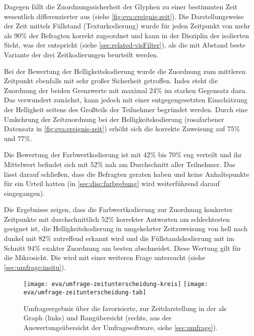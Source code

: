Dagegen fällt die Zuordnungssicherheit der Glyphen zu einer bestimmten Zeit wesentlich differenzierter aus (siehe \autoref{fig:eva:ereignis-zeit}). Die Darstellungsweise der Zeit mittels Füllstand (Texturkodierung) wurde für jeden Zeitpunkt von mehr als 90\% der Befragten korrekt zugeordnet und kann in der Disziplin der isolierten Sicht, was der  entspricht (siehe \autoref{sec:related-visFilter}), als die mit Abstand beste Variante der drei Zeitkodierungen beurteilt werden.

Bei der Bewertung der Helligkeitskodierung wurde die Zuordnung zum mittleren Zeitpunkt ebenfalls mit sehr großer Sicherheit getroffen. Indes steht die Zuordnung der beiden Grenzwerte mit maximal 24\% im starken Gegensatz dazu. Das verwundert zunächst, kann jedoch mit einer entgegengesetzten Einschätzung der Helligkeit seitens des Großteils der Teilnehmer begründet werden. Durch eine Umkehrung der Zeitzuordnung bei der Helligkeitskodierung (rosafarbener Datensatz in \autoref{fig:eva:ereignis-zeit}) erhöht sich die korrekte Zuweisung auf 75\% und 77\%.

Die Bewertung der Farbwertkodierung ist mit 42\% bis 70\% eng verteilt und ihr Mittelwert befindet sich mit 52\% nah am Durchschnitt aller Teilnehmer. Das lässt darauf schließen, dass die Befragten geraten haben und keine Anhaltspunkte für ein Urteil hatten (in \autoref{sec:disc:farbgebung} wird weiterführend darauf eingegangen). 

Die Ergebnisse zeigen, dass die Farbwertkodierung zur Zuordnung konkreter Zeitpunkte mit durchschnittlich 52\% korrekter Antworten am schlechtesten geeignet ist, die Helligkeitskodierung in umgekehrter Zeitzuweisung von hell nach dunkel mit 82\% zutreffend erkannt wird und die Füllstandskodierung mit im Schnitt 94\% exakter Zuordnung am besten abschneidet. Diese Wertung gilt für die Mikrosicht. Die  wird mit einer weiteren Frage untersucht (siehe \autoref{sec:umfrage:insitu}).

\begin{figure}
	\texttt{[image: eva/umfrage-zeitunterscheidung-kreis]}
	\hspace*{.04\textwidth}%
	\texttt{[image: eva/umfrage-zeitunterscheidung-tab]}
	\caption{Umfrageergebnis über die favorisierte,  zur Zeitdarstellung in der  als Graph (links) und Rangübersicht (rechts, aus der Auswertungsübersicht der Umfragesoftware, siehe \autoref{sec:umfrage}).}\label{fig:eva:ereignis-zeitunterscheidung}
\end{figure}

